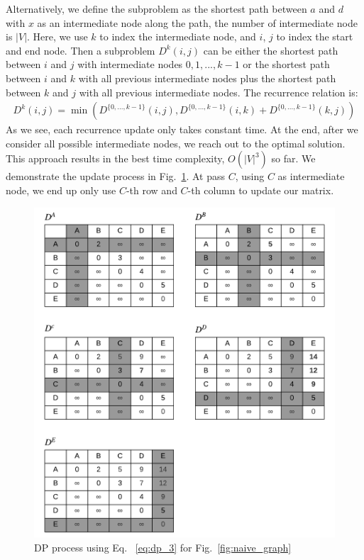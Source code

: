 \documentclass[../main.tex]{subfiles}
\begin{document}
Alternatively, we define the subproblem as the shortest path between $a$ and $d$ with $x$ as an intermediate node along the path, the number of intermediate node is $|V|$. Here, we use $k$ to index the intermediate node, and $i$, $j$ to index the start and end node. Then a subproblem $D^{k}{(i,j)}$ can be either the shortest path between $i$ and $j$ with intermediate nodes ${0, 1, ..., k-1}$ or the shortest path between $i$ and $k$ with all previous intermediate nodes plus the shortest path between $k$ and $j$ with all previous intermediate nodes. The recurrence relation is:%
    \begin{align}
    D^{k}{(i,j)} = \min(D^{\{0, ..., k-1\}}{(i,j)}, D^{\{0,..., k-1\}}{(i,k)}+D^{\{0,..., k-1\}}{(k,j)})
    \label{eq:dp_3}
    \end{align}
As we see, each recurrence update only takes constant time. At the end, after we consider all possible intermediate nodes, we reach out to the optimal solution. This approach results in the best time complexity, $O(|V|^3)$ so far. We demonstrate the update process in Fig.~\ref{fig:dp_3}.  At pass $C$, using $C$ as intermediate node, we end up only use $C$-th row and $C$-th column to update our matrix.
\begin{figure}[!ht]
    \centering
    \includegraphics[width=0.8\columnwidth]{fig/chapter_advanced_graph/DP_shortest_paths (3).png}
        \caption{DP process using Eq. ~\ref{eq:dp_3} for Fig.~\ref{fig:naive_graph}}
    \label{fig:dp_3}
\end{figure}
\end{document}
